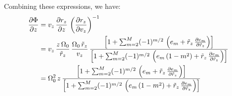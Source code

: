 Combining these expressions, we have:
\begin{align}
    \frac{\partial \Phi}{\partial z} &=
        v_z \, \frac{\partial r_z}{\partial z} \,
        \left( \frac{\partial r_z}{\partial v_z} \right)^{-1}\\
    &= v_z \, \frac{z\,\Omega_0}{\tilde{r}_z} \, \frac{\Omega_0 \, \tilde{r}_z}{v_z} \,
        \frac{\left[
            1 + \sum_{m=2}^{M} (-1)^{m/2} \,
                \left(e_m + \tilde{r}_z \, \frac{\partial e_m}{\partial \tilde{r}_z}\right)
        \right]}{\left[
            1 + \sum_{m=2}^{M} (-1)^{m/2} \,
                \left(e_m\,(1 - m^2) + \tilde{r}_z \, \frac{\partial e_m}{\partial \tilde{r}_z}\right)
        \right]} \\
    &= \Omega_0^2 \, z \,
        \frac{\left[
            1 + \sum_{m=2}^{M} (-1)^{m/2} \,
                \left(e_m + \tilde{r}_z \, \frac{\partial e_m}{\partial \tilde{r}_z}\right)
        \right]}{\left[
            1 + \sum_{m=2}^{M} (-1)^{m/2} \,
                \left(e_m\,(1 - m^2) + \tilde{r}_z \, \frac{\partial e_m}{\partial \tilde{r}_z}\right)
        \right]}
\end{align}





